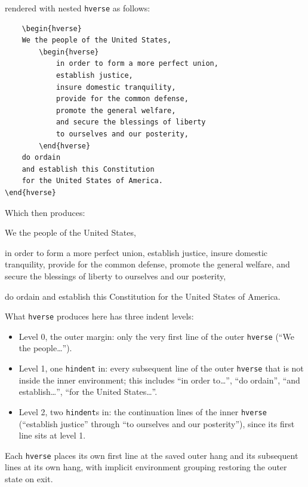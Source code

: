 \documentclass[11pt, twoside, openany]{article}
\newcommand{\opt}[1]{\texttt{#1}}
\newcommand{\env}[1]{\texttt{#1}}
\begin{document}
\noindent rendered with nested \env{hverse} as follows:

\begin{verbatim}
    \begin{hverse}
    We the people of the United States,
        \begin{hverse}
            in order to form a more perfect union,
            establish justice,
            insure domestic tranquility,
            provide for the common defense,
            promote the general welfare,
            and secure the blessings of liberty
            to ourselves and our posterity,
        \end{hverse}
    do ordain
    and establish this Constitution
    for the United States of America.
\end{hverse}
\end{verbatim}

\noindent Which then produces:

\begin{hverse}
    We the people of the United States,
        \begin{hverse}
            in order to form a more perfect union,
            establish justice,
            insure domestic tranquility,
            provide for the common defense,
            promote the general welfare,
            and secure the blessings of liberty
            to ourselves and our posterity,
        \end{hverse}
    do ordain
    and establish this Constitution
    for the United States of America.
\end{hverse}

What \env{hverse} produces here has three indent levels:
\begin{itemize}
  \item Level 0, the outer margin: only the very first line of the outer \env{hverse} (``We the people\ldots'').
  \item Level 1, one \opt{hindent} in: every subsequent line of the outer \env{hverse} that is not inside the inner environment; this includes ``in order to\ldots'', ``do ordain'', ``and establish\ldots'', ``for the United States\ldots''.
  \item Level 2, two \opt{hindent}s in: the continuation lines of the inner \env{hverse} (``establish justice'' through ``to ourselves and our posterity''), since its first line sits at level 1.
\end{itemize}

Each \env{hverse} places its own first line at the saved outer hang and its subsequent lines at its own hang, with implicit environment grouping restoring the outer state on exit.
\end{document}
